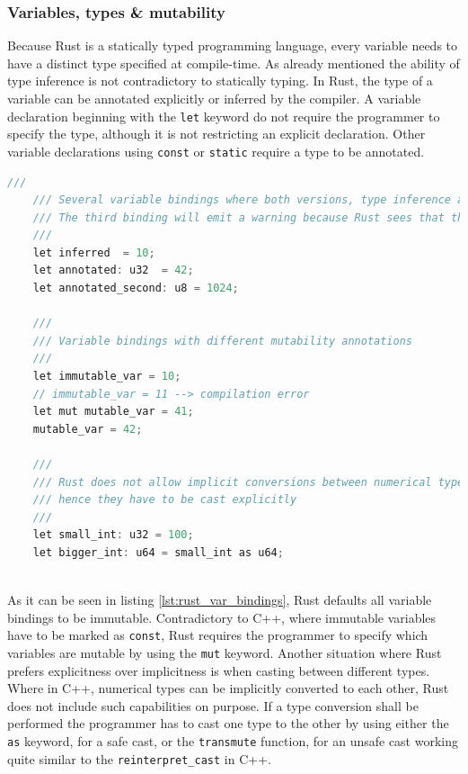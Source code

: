 \subsubsection{Variables, types \& mutability}

Because Rust is a statically typed programming language, every variable needs to have a distinct type specified at compile-time. As already mentioned the ability of type inference is not contradictory to statically typing. In Rust, the type of a variable can be annotated explicitly or inferred by the compiler. A variable declaration beginning with the \texttt{let} keyword do not require the programmer to specify the type, although it is not restricting an explicit declaration. Other variable declarations using \texttt{const} or \texttt{static} require a type to be annotated.\\

\begin{lstlisting}[caption={Variable bindings and mutability declarations in Rust}, label={lst:rust_var_bindings}, language=C]
	///
	/// Several variable bindings where both versions, type inference and type annotations, are showcased.
	/// The third binding will emit a warning because Rust sees that the literal exceeds the range of a 'u8'
	///
	let inferred  = 10;
	let annotated: u32 	= 42;
	let annotated_second: u8 = 1024;
	
	///
	/// Variable bindings with different mutability annotations
	///
	let immutable_var = 10;
	// immutable_var = 11 --> compilation error
	let mut mutable_var = 41;
	mutable_var = 42;
	
	///
	/// Rust does not allow implicit conversions between numerical types, 
	/// hence they have to be cast explicitly
	///
	let small_int: u32 = 100;
	let bigger_int: u64 = small_int as u64;
	
\end{lstlisting}

\noindent
As it can be seen in listing \ref{lst:rust_var_bindings}, Rust defaults all variable bindings to be immutable. Contradictory to C++, where immutable variables have to be marked as \texttt{const}, Rust requires the programmer to specify which variables are mutable by using the \texttt{mut} keyword.
Another situation where Rust prefers explicitness over implicitness is when casting between different types. Where in C++, numerical types can be implicitly converted to each other, Rust does not include such capabilities on purpose. If a type conversion shall be performed the programmer has to cast one type to the other by using either the \texttt{as} keyword, for a safe cast, or the \texttt{transmute} function, for an unsafe cast working quite similar to the \texttt{reinterpret\_cast} in C++.

